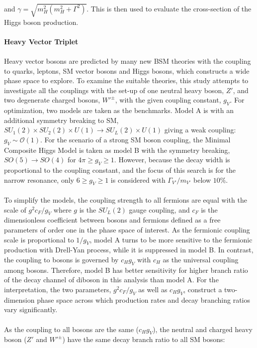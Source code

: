 and $\gamma=\sqrt{m_{H}^2(m_{H}^2+\Gamma^2)}$. This is then used to evaluate the cross-section of the Higgs boson production.
\\
\\{\bf Heavy Vector Triplet}
\\
\\Heavy vector bosons are predicted by many new BSM theories with the coupling to quarks, leptons, SM vector bosons and Higgs bosons, which constructs a wide phase space to explore. To examine the suitable theories, this study attempts to investigate all the couplings with the set-up of one neutral heavy boson, $Z'$, and two degenerate charged bosons, $W'^{\pm}$, with the given coupling constant, $g_{V}$. For optimization,  two models are taken as the benchmarks. Model A is with an additional symmetry breaking to SM, $SU_{1}(2)\times SU_{2}(2) \times U(1) \rightarrow SU_{L}(2) \times U(1)$ giving a weak coupling: $g_{V} \sim \mathcal{O}(1)$. For the scenario of a strong SM boson coupling, the Minimal Composite Higgs Model is taken as model B with the symmetry breaking, $SO(5) \rightarrow SO(4)$ for $4\pi \geq g_{V} \geq 1$. However, because the decay width is proportional to the coupling constant, and the focus of this search is for the narrow resonance, only $6 \geq g_{V} \geq 1$ is considered with $\Gamma_{V'}/m_{V'}$ below $10\%$.
\\
\\To simplify the models, the coupling strength to all fermions are equal with the scale of $g^2c_{F}/g_{V}$ where $g$ is the $SU_{L}(2)$ gauge coupling, and $c_{F}$ is the dimensionless coefficient between bosons and fermions defined as a free parameters of order one in the phase space of interest. As the fermionic coupling scale is proportional to $1/g_{V}$, model A turns to be more sensitive to the fermionic production with Drell-Yan process, while it is suppressed in model B. In contrast, the coupling to bosons is governed by $c_{H}g_{V}$ with $c_{H}$ as the universal coupling among bosons. Therefore, model B has better sensitivity for higher branch ratio of the decay channel of diboson in this analysis than model A. For the interpretation, the two parameters, $g^2c_{F}/g_{V}$ as well as $c_{H}g_{V}$, construct a two-dimension phase space across which production rates and decay branching ratios vary significantly. 
\\
\\As the coupling to all bosons are the same ($c_{H}g_{V}$), the neutral and charged heavy boson ($Z'$ and $W'^{\pm}$) have the same decay branch ratio to all SM bosons:
